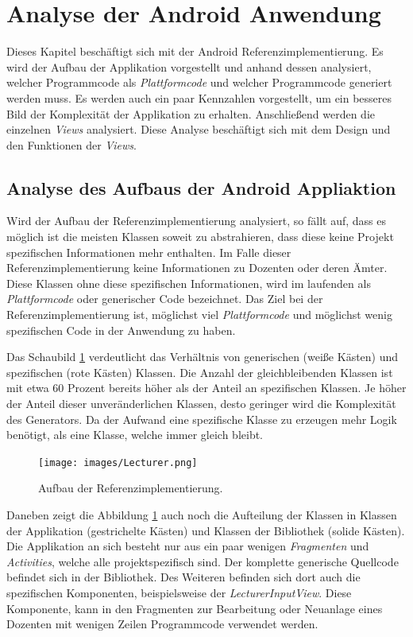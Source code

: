 \section{Analyse der Android Anwendung}
Dieses Kapitel beschäftigt sich mit der Android Referenzimplementierung. Es wird der Aufbau der Applikation vorgestellt und anhand dessen analysiert, welcher Programmcode als \textit{Plattformcode} und welcher Programmcode generiert werden muss. Es werden auch ein paar Kennzahlen vorgestellt, um ein besseres Bild der Komplexität der Applikation zu erhalten. Anschließend werden die einzelnen \textit{Views} analysiert. Diese Analyse beschäftigt sich mit dem Design und den Funktionen der \textit{Views}.

\subsection{Analyse des Aufbaus der Android Appliaktion}
Wird der Aufbau der Referenzimplementierung analysiert, so fällt auf, dass es möglich ist die meisten Klassen soweit zu abstrahieren, dass diese keine Projekt spezifischen Informationen mehr enthalten. Im Falle dieser Referenzimplementierung keine Informationen zu Dozenten oder deren Ämter. Diese Klassen ohne diese spezifischen Informationen, wird im laufenden als \textit{Plattformcode} oder generischer Code bezeichnet. Das Ziel bei der Referenzimplementierung ist, möglichst viel \textit{Plattformcode} und möglichst wenig spezifischen Code in der Anwendung zu haben. 

Das Schaubild \ref{fig:lecturer_structure} verdeutlicht das Verhältnis von generischen (weiße Kästen) und spezifischen (rote Kästen) Klassen. Die Anzahl der gleichbleibenden Klassen ist mit etwa 60 Prozent bereits höher als der Anteil an spezifischen Klassen. Je höher der Anteil dieser unveränderlichen Klassen, desto geringer wird die Komplexität des Generators. Da der Aufwand eine spezifische Klasse zu erzeugen mehr Logik benötigt, als eine Klasse, welche immer gleich bleibt.

\begin{figure}[H]
	\begin{center}
		\texttt{[image: images/Lecturer.png]}
		\caption{Aufbau der Referenzimplementierung.}
		\label{fig:lecturer_structure}
	\end{center}
\end{figure}

Daneben zeigt die Abbildung \ref{fig:lecturer_structure} auch noch die Aufteilung der Klassen in Klassen der Applikation (gestrichelte Kästen) und Klassen der Bibliothek (solide Kästen). Die Applikation an sich besteht nur aus ein paar wenigen \textit{Fragmenten} und \textit{Activities}, welche alle projektspezifisch sind. Der komplette generische Quellcode befindet sich in der Bibliothek. Des Weiteren befinden sich dort auch die spezifischen Komponenten, beispielsweise der \textit{LecturerInputView}. Diese Komponente, kann in den Fragmenten zur Bearbeitung oder Neuanlage eines Dozenten mit wenigen Zeilen Programmcode verwendet werden.

